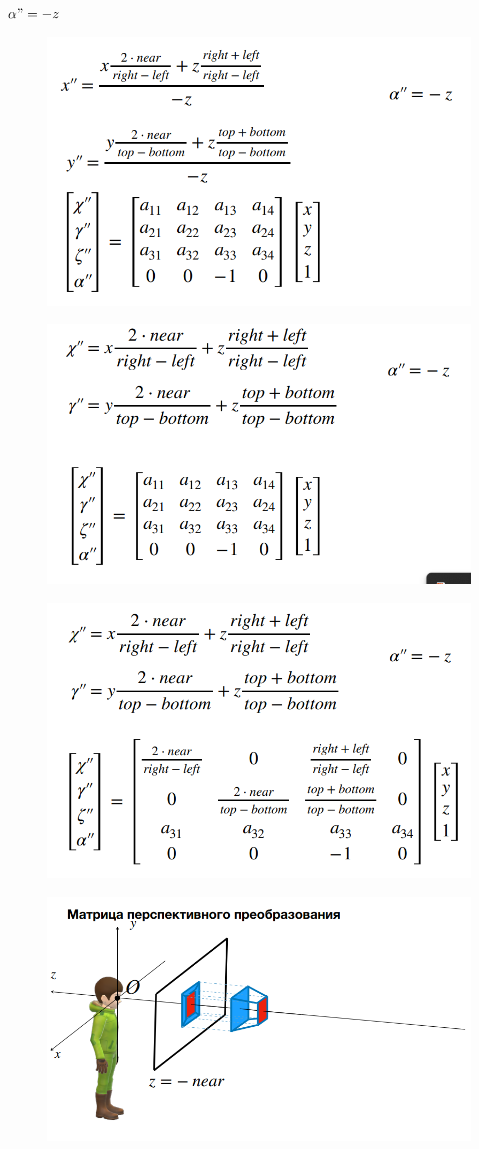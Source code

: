 \documentclass{article}
\begin{document}
$\alpha" = -z $

\begin{figure} [H]
    \includegraphics[width=0.70\linewidth]{Снимок экрана 2025-04-07 122852.png}
\end{figure}

\begin{figure} [H]
    \includegraphics[width=0.70\linewidth]{Снимок экрана 2025-04-07 122855.png}
\end{figure}

\begin{figure} [H]
    \includegraphics[width=0.70\linewidth]{Снимок экрана 2025-04-07 122904.png}
\end{figure}

\begin{figure} [H]
    \includegraphics[width=0.70\linewidth]{Снимок экрана 2025-04-07 123233.png}
\end{figure}
\end{document}
